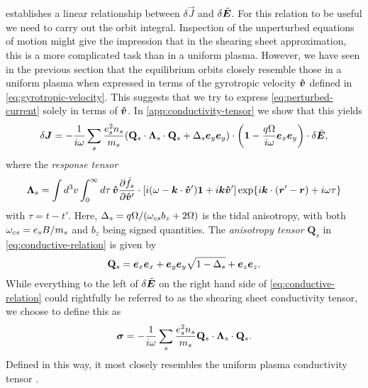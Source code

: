 \documentclass[aps,pre,notitlepage,amsmath,amssymb,amsfonts,nobibnotes,nofootinbib]{revtex4-1}
\begin{document}
 establishes a linear relationship between
$\delta\vec{J}$ and $\delta\tilde{\bm{E}}$. For this relation to be useful we need
to carry out the orbit integral. Inspection of the unperturbed equations of
motion might give the impression that in the shearing sheet approximation,
this is a more complicated task than in a uniform plasma. However, we have
seen in the previous section that the equilibrium orbits closely resemble
those in a uniform plasma when expressed in terms of the gyrotropic velocity
$\bm{\mathring{v}}$ defined in \cref{eq:gyrotropic-velocity}. This suggests that we try to
express \cref{eq:perturbed-current} solely in terms of $\bm{\mathring{v}}$. In
\cref{app:conductivity-tensor} we show that this yields
\begin{equation}
  \label{eq:conductive-relation}
  \delta\vec{J} =
  - \frac{1}{i\omega}\sums\frac{\qs^2 n_s}{m_s}
  \left(
    \mathbf{Q}_s\cdot\mathbf{\Lambda}_s\cdot\mathbf{Q}_s + \Delta_s\ey\ey
  \right)\cdot\left(\mathbf{1} - \frac{q\Omega}{i\omega}\ex\ey\right)
  \cdot\delta\tvec{E},
\end{equation}
where the \emph{response tensor}
\begin{equation}
  \label{eq:response-tensor}
  \mathbf{\Lambda}_s =
  \int d^3v\int_0^\infty d\tau\,
  \vvc\pder{\hat{f}_s}{\vvc'}\cdot
  [i(\omega - \vec{k}\cdot\vvc')\mathbf{1} + i\vec{k}\vvc']
  \exp\{i\vec{k}\cdot(\vec{r}'-\vec{r}) + i\omega\tau\}
\end{equation}
with $\tau=t-t'$. Here, $\Delta_s=q\Omega/(\omega_{cs}{}b_z+2\Omega)$ is the tidal
anisotropy, with both $\omega_{cs}=e_s{}B/m_s$ and $b_z$ being signed quantities.
The \emph{anisotropy tensor} $\mathbf{Q}_s$ in \cref{eq:conductive-relation}
is given by
\begin{equation}
  \label{eq:anisotropy-tensor}
  \mathbf{Q}_s = \ex\ex + \ey\ey\sqrt{1-\Delta_s} + \ez\ez.
\end{equation}
While everything to the left of $\delta\tilde{\bm{E}}$ on the right hand side of
\cref{eq:conductive-relation} could rightfully be referred to as the shearing
sheet conductivity tensor, we choose to define this as
\begin{equation}
  \label{eq:conductivity}
  \vec{\sigma} = -\frac{1}{i\omega}\sums\frac{\qs^2n_s}{m_s}
  \mathbf{Q}_s\cdot\mathbf{\Lambda}_s\cdot\mathbf{Q}_s.
\end{equation}
Defined in this way, it most closely resembles the uniform plasma conductivity
tensor \citep[see e.g.][]{Ichimaru1973}.
\end{document}

